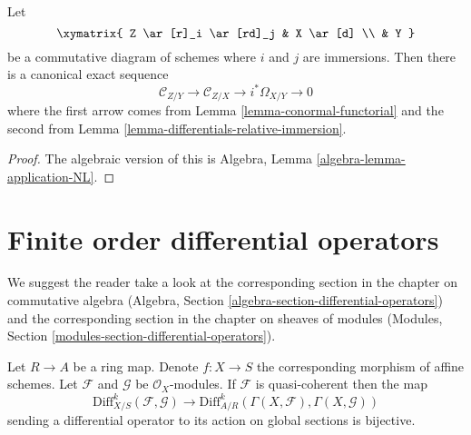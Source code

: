 \begin{lemma}
\label{lemma-two-immersions}
Let
$$
\xymatrix{
Z \ar[r]_i \ar[rd]_j & X \ar[d] \\
& Y
}
$$
be a commutative diagram of schemes where $i$ and $j$ are immersions.
Then there is a canonical exact sequence
$$
\mathcal{C}_{Z/Y} \to
\mathcal{C}_{Z/X} \to
i^*\Omega_{X/Y} \to 0
$$
where the first arrow comes from
Lemma \ref{lemma-conormal-functorial}
and the second from
Lemma \ref{lemma-differentials-relative-immersion}.
\end{lemma}

\begin{proof}
The algebraic version of this is
Algebra, Lemma \ref{algebra-lemma-application-NL}.
\end{proof}










\section{Finite order differential operators}
\label{section-differential-operators}

\noindent
We suggest the reader take a look at the corresponding section
in the chapter on commutative algebra
(Algebra, Section \ref{algebra-section-differential-operators})
and the corresponding section in the chapter on sheaves of modules
(Modules, Section \ref{modules-section-differential-operators}).

\begin{lemma}
\label{lemma-affine-case-differential-operators}
Let $R \to A$ be a ring map. Denote $f : X \to S$ the corresponding
morphism of affine schemes. Let $\mathcal{F}$ and $\mathcal{G}$
be $\mathcal{O}_X$-modules. If $\mathcal{F}$ is quasi-coherent then
the map
$$
\text{Diff}^k_{X/S}(\mathcal{F}, \mathcal{G}) \to
\text{Diff}^k_{A/R}(\Gamma(X, \mathcal{F}), \Gamma(X, \mathcal{G}))
$$
sending a differential operator to its action on global sections
is bijective.
\end{lemma}

